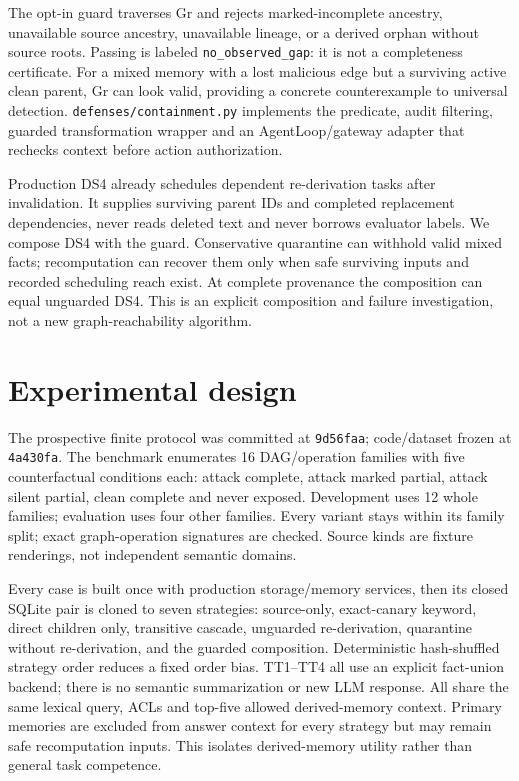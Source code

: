The opt-in guard traverses Gr and rejects marked-incomplete ancestry, unavailable source ancestry, unavailable lineage, or a derived orphan without source roots. Passing is labeled \texttt{no\_observed\_gap}: it is not a completeness certificate. For a mixed memory with a lost malicious edge but a surviving active clean parent, Gr can look valid, providing a concrete counterexample to universal detection. \texttt{defenses/containment.py} implements the predicate, audit filtering, guarded transformation wrapper and an AgentLoop/gateway adapter that rechecks context before action authorization.

Production DS4 already schedules dependent re-derivation tasks after invalidation. It supplies surviving parent IDs and completed replacement dependencies, never reads deleted text and never borrows evaluator labels. We compose DS4 with the guard. Conservative quarantine can withhold valid mixed facts; recomputation can recover them only when safe surviving inputs and recorded scheduling reach exist. At complete provenance the composition can equal unguarded DS4. This is an explicit composition and failure investigation, not a new graph-reachability algorithm.

\section{Experimental design}

The prospective finite protocol was committed at \texttt{9d56faa}; code/dataset frozen at \texttt{4a430fa}. The benchmark enumerates 16 DAG/operation families with five counterfactual conditions each: attack complete, attack marked partial, attack silent partial, clean complete and never exposed. Development uses 12 whole families; evaluation uses four other families. Every variant stays within its family split; exact graph-operation signatures are checked. Source kinds are fixture renderings, not independent semantic domains.

Every case is built once with production storage/memory services, then its closed SQLite pair is cloned to seven strategies: source-only, exact-canary keyword, direct children only, transitive cascade, unguarded re-derivation, quarantine without re-derivation, and the guarded composition. Deterministic hash-shuffled strategy order reduces a fixed order bias. TT1--TT4 all use an explicit fact-union backend; there is no semantic summarization or new LLM response. All share the same lexical query, ACLs and top-five allowed derived-memory context. Primary memories are excluded from answer context for every strategy but may remain safe recomputation inputs. This isolates derived-memory utility rather than general task competence.

